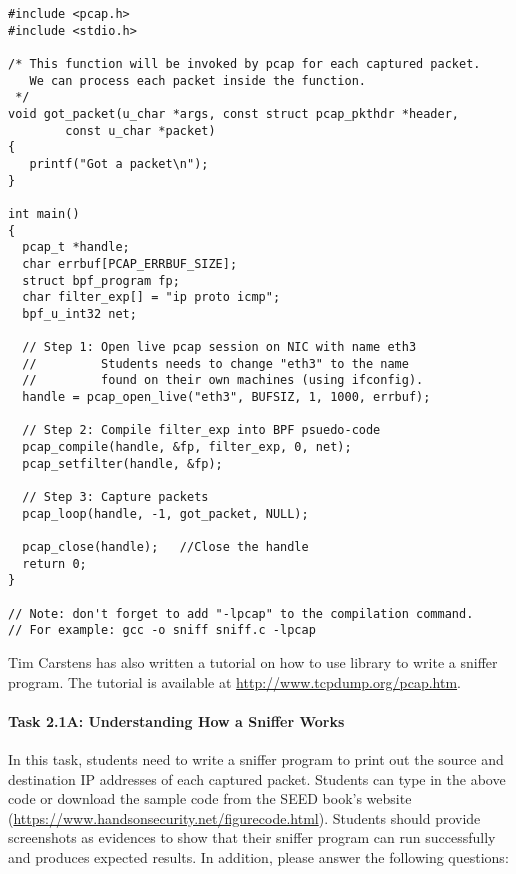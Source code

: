 \begin{lstlisting}
#include <pcap.h>
#include <stdio.h>

/* This function will be invoked by pcap for each captured packet.
   We can process each packet inside the function.  
 */
void got_packet(u_char *args, const struct pcap_pkthdr *header,
        const u_char *packet)
{
   printf("Got a packet\n");
}

int main()
{
  pcap_t *handle;
  char errbuf[PCAP_ERRBUF_SIZE];
  struct bpf_program fp;
  char filter_exp[] = "ip proto icmp";
  bpf_u_int32 net;

  // Step 1: Open live pcap session on NIC with name eth3
  //         Students needs to change "eth3" to the name 
  //         found on their own machines (using ifconfig).
  handle = pcap_open_live("eth3", BUFSIZ, 1, 1000, errbuf); 

  // Step 2: Compile filter_exp into BPF psuedo-code
  pcap_compile(handle, &fp, filter_exp, 0, net);            
  pcap_setfilter(handle, &fp);                              

  // Step 3: Capture packets
  pcap_loop(handle, -1, got_packet, NULL);                  

  pcap_close(handle);   //Close the handle
  return 0;
}

// Note: don't forget to add "-lpcap" to the compilation command.
// For example: gcc -o sniff sniff.c -lpcap
\end{lstlisting}


Tim Carstens has also written a tutorial on how to use 
\pcap library to write a sniffer program. The tutorial is 
available at \url{http://www.tcpdump.org/pcap.htm}.  
 

\paragraph{Task 2.1A: Understanding How a Sniffer Works}
In this task, students need to write a sniffer program to 
print out the source and destination IP addresses of each captured 
packet. Students can type in the above code or download the sample code from the 
SEED book's website (\url{https://www.handsonsecurity.net/figurecode.html}). 
Students should provide screenshots as evidences to show that their sniffer
program can run successfully and produces expected 
results. In addition, please answer the following questions:

